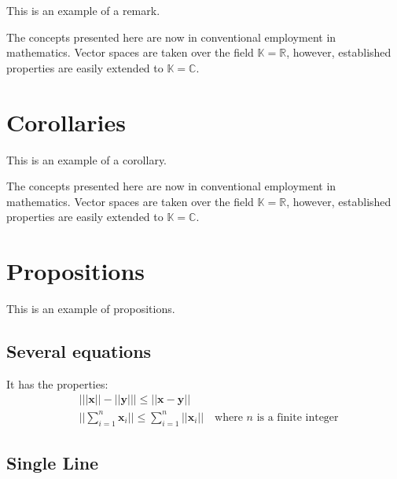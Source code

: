 \documentclass[11pt,fleqn,a5paper]{book} %
\begin{document}
    This is an example of a remark.
    
    \begin{remark}
    The concepts presented here are now in conventional employment in mathematics. Vector spaces are taken over the field $\mathbb{K}=\mathbb{R}$, however, established properties are easily extended to $\mathbb{K}=\mathbb{C}$.
    \end{remark}
    
    
    \section{Corollaries}
    
    This is an example of a corollary.
    
    \begin{corollary}
    The concepts presented here are now in conventional employment in mathematics. Vector spaces are taken over the field $\mathbb{K}=\mathbb{R}$, however, established properties are easily extended to $\mathbb{K}=\mathbb{C}$.
    \end{corollary}
    
    
    \section{Propositions}
    
    This is an example of propositions.
    
    \subsection{Several equations}
    
    \begin{proposition}
    It has the properties:
    \begin{align}
    & \big| ||\mathbf{x}|| - ||\mathbf{y}|| \big|\leq || \mathbf{x}- \mathbf{y}||\\
    &  ||\sum_{i=1}^n\mathbf{x}_i||\leq \sum_{i=1}^n||\mathbf{x}_i||\quad\text{where $n$ is a finite integer}
    \end{align}
    \end{proposition}
    
    \subsection{Single Line}
    
\end{document}
